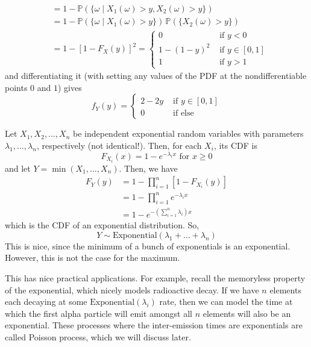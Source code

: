 \begin{example}[Uniforms]
\begin{align*}
        & = 1 - \mathbb{P}(\{\omega \mid X_1 (\omega) > y, X_2 (\omega) > y \}) \\
        & = 1 - \mathbb{P}(\{\omega \mid X_1 (\omega) > y\}) \, \mathbb{P}(\{ X_2 (\omega) > y \}) \\ 
        & = 1 - [1 - F_X (y)]^2 = \begin{cases} 0 & \text{ if } y < 0 \\
        1 - (1 - y)^2 & \text{ if } y \in [0, 1] \\
        1 & \text{ if } y > 1 \end{cases} 
      \end{align*}
      and differentiating it (with setting any values of the PDF at the nondifferentiable points $0$ and $1$) gives 
      \begin{equation}
        f_Y (y) = \begin{cases} 2 - 2y & \text{ if } y \in [0, 1] \\
        0 & \text{ if else} \end{cases}
      \end{equation}
    \end{example}

    \begin{example}[Exponentials]
      Let $X_1, X_2, \ldots, X_n$ be independent exponential random variables with parameters $\lambda_1, \ldots, \lambda_n$, respectively (not identical!). Then, for each $X_i$, its CDF is 
      \begin{equation}
        F_{X_i} (x) = 1 - e^{-\lambda_i x} \text{ for } x \geq 0
      \end{equation}
      and let $Y = \min(X_1, \ldots, X_n)$. Then, we have 
      \begin{align*}
        F_Y (y) & = 1 - \prod_{i=1}^n [ 1 - F_{X_i} (y)] \\
        & = 1 - \prod_{i=1}^n e^{-\lambda_i x} \\
        & = 1 - e^{- ( \sum_{i=1}^n \lambda_i ) x}
      \end{align*}
      which is the CDF of an exponential distribution. So, 
      \begin{equation}
        Y \sim \mathrm{Exponential}(\lambda_1 + \ldots + \lambda_n)
      \end{equation}
      This is nice, since the minimum of a bunch of exponentials is an exponential. However, this is not the case for the maximum. 
    \end{example}

    This has nice practical applications. For example, recall the memoryless property of the exponential, which nicely models radioactive decay. If we have $n$ elements each decaying at some $\mathrm{Exponential}(\lambda_i)$ rate, then we can model the time at which the first alpha particle will emit amongst all $n$ elements will also be an exponential. These processes where the inter-emission times are exponentials are called Poisson process, which we will discuss later. 

